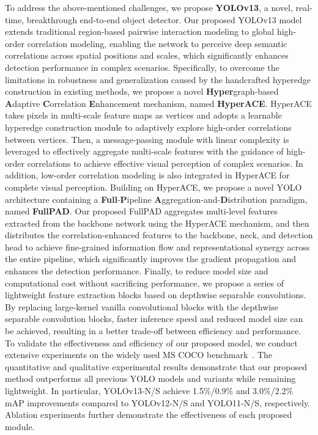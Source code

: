 To address the above-mentioned challenges, we propose \textbf{YOLOv13}, a novel, real-time, breakthrough end-to-end object detector. Our proposed YOLOv13 model extends traditional region-based pairwise interaction modeling to global high-order correlation modeling, enabling the network to perceive deep semantic correlations across spatial positions and scales, which significantly enhances detection performance in complex scenarios. Specifically, to overcome the limitations in robustness and generalization caused by the handcrafted hyperedge construction in existing methods, we propose a novel \textbf{Hyper}graph-based \textbf{A}daptive \textbf{C}orrelation \textbf{E}nhancement mechanism, named \textbf{HyperACE}. HyperACE takes pixels in multi-scale feature maps as vertices and adopts a learnable hyperedge construction module to adaptively explore high-order correlations between vertices. Then, a message-passing module with linear complexity is leveraged to effectively aggregate multi-scale features with the guidance of high-order correlations to achieve effective visual perception of complex scenarios. In addition, low-order correlation modeling is also integrated in HyperACE for complete visual perception. Building on HyperACE, we propose a novel YOLO architecture containing a \textbf{Full}‑\textbf{P}ipeline \textbf{A}ggregation‑and-\textbf{D}istribution paradigm, named \textbf{FullPAD}. Our proposed FullPAD aggregates multi-level features extracted from the backbone network using the HyperACE mechanism, and then distributes the correlation-enhanced features to the backbone, neck, and detection head to achieve fine‑grained information flow and representational synergy across the entire pipeline, which significantly improves the gradient propagation and enhances the detection performance. Finally, to reduce model size and computational cost without sacrificing performance, we propose a series of lightweight feature extraction blocks based on depthwise separable convolutions. By replacing large‑kernel vanilla convolutional blocks with the depthwise separable convolution blocks, faster inference speed and reduced model size can be achieved, resulting in a better trade-off between efficiency and performance. To validate the effectiveness and efficiency of our proposed model, we conduct extensive experiments on the widely used MS COCO benchmark~\cite{mscoco}. The quantitative and qualitative experimental results demonstrate that our proposed method outperforms all previous YOLO models and variants while remaining lightweight. In particular, YOLOv13‑N/S achieve 1.5\%/0.9\% and 3.0\%/2.2\% mAP improvements compared to YOLOv12‑N/S and YOLO11‑N/S, respectively. Ablation experiments further demonstrate the effectiveness of each proposed module.

